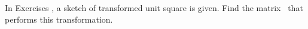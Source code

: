 {\noin In Exercises}
{, a sketch of transformed unit square is given. Find the matrix \tta\ that performs this transformation.}
